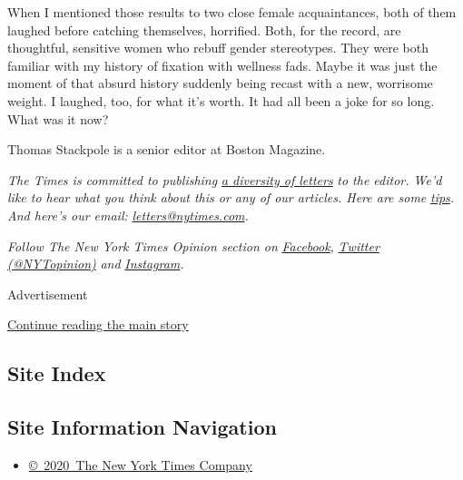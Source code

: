 When I mentioned those results to two close female acquaintances, both
of them laughed before catching themselves, horrified. Both, for the
record, are thoughtful, sensitive women who rebuff gender stereotypes.
They were both familiar with my history of fixation with wellness fads.
Maybe it was just the moment of that absurd history suddenly being
recast with a new, worrisome weight. I laughed, too, for what it's
worth. It had all been a joke for so long. What was it now?

Thomas Stackpole is a senior editor at Boston Magazine.

\emph{The Times is committed to publishing}
\href{https://www.nytimes.com/2019/01/31/opinion/letters/letters-to-editor-new-york-times-women.html}{\emph{a
diversity of letters}} \emph{to the editor. We'd like to hear what you
think about this or any of our articles. Here are some}
\href{https://help.nytimes.com/hc/en-us/articles/115014925288-How-to-submit-a-letter-to-the-editor}{\emph{tips}}\emph{.
And here's our email:}
\href{mailto:letters@nytimes.com}{\emph{letters@nytimes.com}}\emph{.}

\emph{Follow The New York Times Opinion section on}
\href{https://www.facebook.com/nytopinion}{\emph{Facebook}}\emph{,}
\href{http://twitter.com/NYTOpinion}{\emph{Twitter (@NYTopinion)}}
\emph{and}
\href{https://www.instagram.com/nytopinion/}{\emph{Instagram}}\emph{.}

Advertisement

\protect\hyperlink{after-bottom}{Continue reading the main story}

\hypertarget{site-index}{%
\subsection{Site Index}\label{site-index}}

\hypertarget{site-information-navigation}{%
\subsection{Site Information
Navigation}\label{site-information-navigation}}

\begin{itemize}
\tightlist
\item
  \href{https://help.nytimes.com/hc/en-us/articles/115014792127-Copyright-notice}{©~2020~The
  New York Times Company}
\end{itemize}

